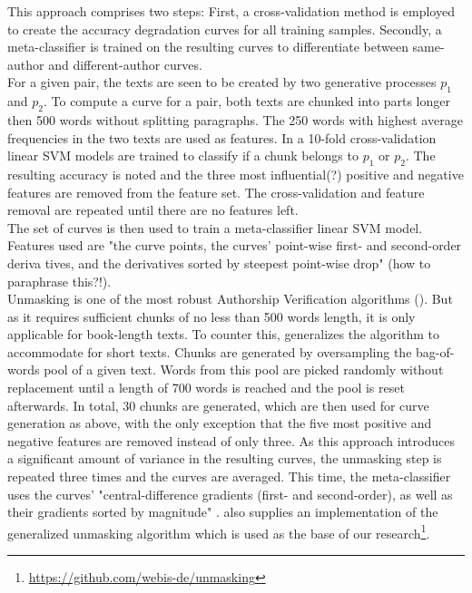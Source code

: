 This approach comprises two steps: First, a cross-validation method is employed to create the accuracy degradation curves for all training samples.
Secondly, a meta-classifier is trained on the resulting curves to differentiate between same-author and different-author curves.\\
For a given pair, the texts are seen to be created by two generative processes $p_1$ and $p_2$.
To compute a curve for a pair, both texts are chunked into parts longer then 500 words without splitting paragraphs.
The 250 words with highest average frequencies in the two texts are used as features.
In a 10-fold cross-validation linear SVM models are trained to classify if a chunk belongs to $p_1$ or $p_2$.
The resulting accuracy is noted and the three most influential(?) positive and negative features are removed from the feature set.
The cross-validation and feature removal are repeated until there are no features left.\\
The set of curves is then used to train a meta-classifier linear SVM model.
Features used are "the curve points, the curves' point-wise first- and second-order deriva
tives, and the derivatives sorted by steepest point-wise drop" \cite{bevendorff2019unmaskingShortTexts}(how to paraphrase this?!).\\
Unmasking is one of the most robust Authorship Verification algorithms (\cite{bevendorff2019unmaskingShortTexts}).
But as it requires sufficient chunks of no less than 500 words length, it is only applicable for book-length texts.
To counter this, \cite{bevendorff2019unmaskingShortTexts} generalizes the algorithm to accommodate for short texts.
Chunks are generated by oversampling the bag-of-words pool of a given text.
Words from this pool are picked randomly without replacement until a length of 700 words is reached and the pool is reset afterwards.
In total, 30 chunks are generated, which are then used for curve generation as above, with the only exception that the five most positive and negative features are removed instead of only three.
As this approach introduces a significant amount of variance in the resulting curves, the unmasking step is repeated three times and the curves are averaged.
This time, the meta-classifier uses the curves' "central-difference gradients (first- and second-order), as well as their gradients sorted by magnitude" \cite{bevendorff2019unmaskingShortTexts}.
\cite{bevendorff2019unmaskingShortTexts} also supplies an implementation of the generalized unmasking algorithm which is used as the base of our research\footnote{\url{https://github.com/webis-de/unmasking}}.\\

